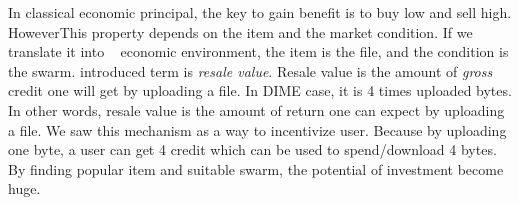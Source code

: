 In classical economic principal, the key to gain benefit is to buy low and sell high. HoweverThis property depends on the item and the market condition. If we translate it into \bt~ economic environment, the item is the file, and the condition is the swarm. \citeauthor{2012:economicbt:kash} introduced term is \textit{resale value}. Resale value is the amount of \textit{gross} credit one will get by uploading a file. In DIME case, it is 4 times uploaded bytes. In other words, resale value is the amount of return one can expect by uploading a file. We saw this mechanism as a way to incentivize user. Because by uploading one byte, a user can get 4 credit which can be used to spend/download 4 bytes. By finding popular item and suitable swarm, the potential of investment become huge.